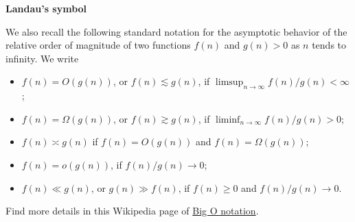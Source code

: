 \documentclass[19pt,landscaoe]{article}
\begin{document}
\newpage
{\LARGE\centerline{\textbf{Landau's symbol}}}
\vskip25pt
\begin{minipage}{.9\textwidth}
   \Large
   We also recall the following standard notation for the asymptotic behavior of the relative order of magnitude of two functions $f(n)$ and $g(n )>0$ as $n$ tends to infinity.
   We write
   \begin{itemize}
      \item
        $f(n)=O(g(n))$,
        or $f(n ) \lesssim g(n )$, if $\limsup_{n \to\infty} f(n ) / g(n ) <\infty$;
      \item
        $f(n)=\Omega(g(n ))$, or 
        $f(n ) \gtrsim g(n )$, if $\liminf_{n \to\infty} f(n) / g(n)>0$;
      \item $f(n)\asymp g(n)$ if $f(n)=O(g(n))$ and $f(n)=\Omega(g(n))$; %
     \item $f(n)=o(g(n))$, if $f(n)/g(n)\to 0$;
      \item $f(n)\ll g(n)$, or $g(n)\gg f(n)$, if $f(n)\ge0$ and $f(n)/g(n)\to 0$.
  \end{itemize}
  Find more details in this Wikipedia page of \href{https://en.wikipedia.org/wiki/Big_O_notation#History_(Bachmann–Landau,_Hardy,_and_Vinogradov_notations)}{Big O notation}.
\end{minipage}
\end{document}
